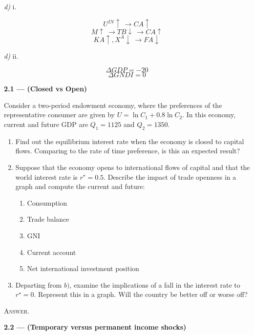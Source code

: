 \documentclass[11pt, a4paper]{article}
\begin{document}
\textit{d)} i.


$$U^{IN} \uparrow \ \rightarrow CA \uparrow$$
$$M \uparrow \ \rightarrow TB \downarrow \ \rightarrow CA  \uparrow$$
$$KA \uparrow, X^A \downarrow \ \rightarrow FA \downarrow$$


\textit{d)} ii.

$$ \Delta GDP = -20$$
$$ \Delta GNDI = 0$$

\clearpage

\textbf{2.1 — (Closed vs Open)}

Consider a two-period endowment economy, where the preferences of the representative consumer are given by $U=\ln{C_1} + 0.8\ln{C_2}$. In this economy, current and future GDP are $Q_1 = 1125$ and $Q_2 = 1350$.

\begin{enumerate}[label=\emph{\alph*}), topsep = \lineskip, itemsep = \lineskip, partopsep = \lineskip, parsep = \lineskip]
	\item Find out the equilibrium interest rate when the economy is closed to capital flows. Comparing to the rate of time preference, is this an expected result?
	\item Suppose that the economy opens to international flows of capital and that the world interest rate is $r^\star = 0.5$. Describe the impact of trade openness in a graph and compute the current and future:
	\begin{enumerate}[label=\roman*., topsep = \lineskip, itemsep = \lineskip, partopsep = \lineskip, parsep = \lineskip]
		\item Consumption
    \item Trade balance
    \item GNI
    \item Current account
    \item Net international investment position
	\end{enumerate}
	\item Departing from $\mathit{b)}$, examine the implications of a fall in the interest rate to $r^\star = 0$. Represent this in a graph. Will the country be better off or worse off?
\end{enumerate}

\dotfill

\textsc{Answer.}

\clearpage
\textbf{2.2 — (Temporary versus permanent income shocks)}
\end{document}
